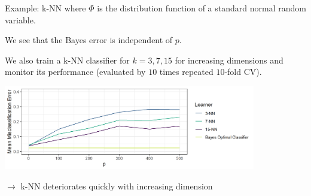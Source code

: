 \begin{vbframe}{Example: k-NN}
where $\Phi$ is the distribution function of a standard normal random variable. 

\lz 

We see that the Bayes error is independent of $p$. 


\framebreak

We also train a k-NN classifier for $k = 3, 7, 15$ for increasing dimensions and monitor its performance (evaluated by $10$ times repeated $10$-fold CV).
\medskip

\begin{center}
\includegraphics[width = 11cm ]{figure/knn_misclassification_plot.png}
\end{center}

$\to$ k-NN deteriorates quickly with increasing dimension


\end{vbframe}


